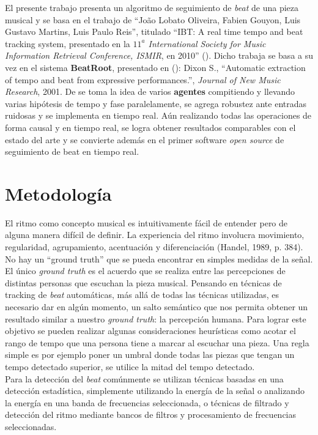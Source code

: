 \documentclass[12pt,a4paper,titlepage]{report}
\begin{document}
El presente trabajo presenta un algoritmo de seguimiento de \emph{beat} de una pieza musical y se basa en el trabajo de ``Jo\~ao Lobato Oliveira, Fabien Gouyon, Luis Gustavo Martins, Luis Paulo Reis'', titulado ``IBT: A real time tempo and beat tracking system, presentado en la \emph{$11^a$ International Society for Music Information Retrieval Conference, ISMIR}, en 2010'' (\cite{bib:el_posta}). Dicho trabaja se basa a su vez en el sistema \textbf{BeatRoot}, presentado en (\cite{bib:dixon}): Dixon S., ``Automatic extraction of tempo and beat from expressive performances.'', \emph{Journal of New Music Research}, 2001. De \cite{bib:dixon} se toma la idea de varios \textbf{agentes} compitiendo y llevando varias hipótesis de tempo y fase paralelamente, se agrega robustez ante entradas ruidosas y se implementa en tiempo real. Aún realizando todas las operaciones de forma causal y en tiempo real, se logra obtener resultados comparables con el estado del arte y se convierte además en el primer software \emph{open source} de seguimiento de beat en tiempo real.


\chapter{Metodología}
\label{sec:metodologia}

El ritmo como concepto musical es intuitivamente fácil de entender pero de alguna manera difícil de definir. La experiencia del ritmo involucra movimiento, regularidad, agrupamiento, acentuación y diferenciación (Handel, 1989, p. 384). No hay un ``ground truth'' que se pueda encontrar en simples medidas de la señal. El único \emph{ground truth} es el acuerdo que se realiza entre las percepciones de distintas personas que escuchan la pieza musical. Pensando en técnicas de tracking de \emph{beat} automáticas, más allá de todas las técnicas utilizadas, es necesario dar en algún momento, un salto semántico que nos permita obtener un resultado similar a nuestro \emph{ground truth}: la percepción humana. Para lograr este objetivo se pueden realizar algunas consideraciones heurísticas como acotar el rango de tempo que una persona tiene a marcar al escuchar una pieza. Una regla simple es por ejemplo poner un umbral donde todas las piezas que tengan un tempo detectado superior, se utilice la mitad del tempo detectado.\\

Para la detección del \emph{beat} comúnmente se utilizan técnicas basadas en una detección estadística, simplemente utilizando la energía de la señal o analizando la energía en una banda de frecuencias seleccionada, o técnicas de filtrado y detección del ritmo mediante bancos de filtros y procesamiento de frecuencias seleccionadas.\\
\end{document}

